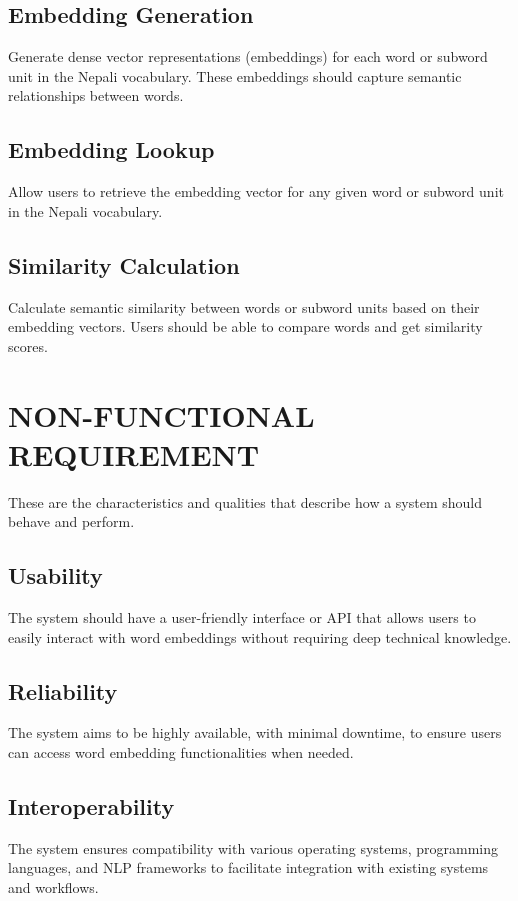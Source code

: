             \subsection{Embedding Generation}
            Generate dense vector representations (embeddings) for each word or subword unit in the Nepali vocabulary. These embeddings should capture semantic relationships between words.

            \subsection{Embedding Lookup}
            Allow users to retrieve the embedding vector for any given word or subword unit in the Nepali vocabulary.

            \subsection{Similarity Calculation}
            Calculate semantic similarity between words or subword units based on their embedding vectors. Users should be able to compare words and get similarity scores.

        \section{NON-FUNCTIONAL REQUIREMENT}
            These are the characteristics and qualities that describe how a system should behave and perform.

            \subsection{Usability}            
            The system should have a user-friendly interface or API that allows users to easily interact with word embeddings without requiring deep technical knowledge.

            \subsection{Reliability}
            The system aims to be highly available, with minimal downtime, to ensure users can access word embedding functionalities when needed.

            \subsection{Interoperability}
            The system ensures compatibility with various operating systems, programming languages, and NLP frameworks to facilitate integration with existing systems and workflows.

